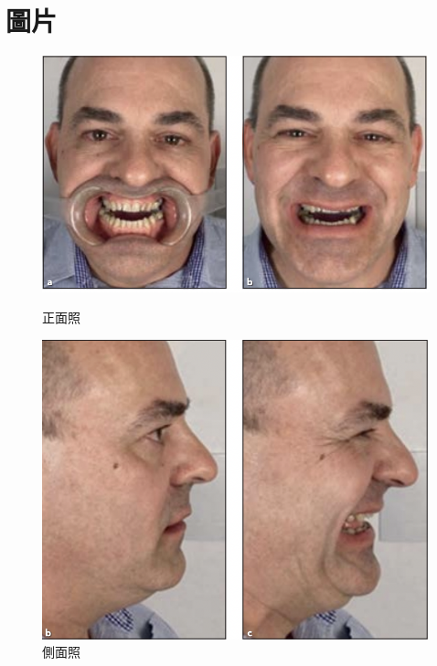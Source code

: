 \section{圖片}
\begin{figure}[H]
  \centering
  \begin{minipage}[b]{0.4\textwidth} %
  \centering
  \includegraphics[width=1\textwidth]{paste_src/2023-02-07-20-49-33.png}
  \caption{正面照}
  \label{fig:正面}
  \end{minipage}
  \begin{minipage}[b]{0.4\textwidth} %
  \centering
  \includegraphics[width=1\textwidth]{paste_src/2023-02-07-20-50-39.png}
  \caption{側面照}
  \label{fig:側面}
  \end{minipage}
  \end{figure}
  
